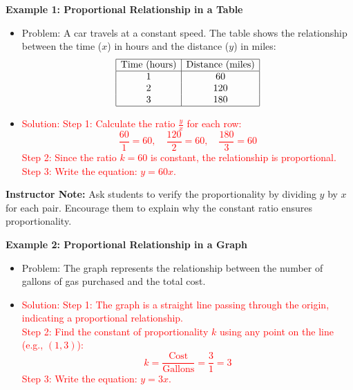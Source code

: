 \documentclass[12pt]{article}
\begin{document}
\vspace{1em}

\begin{tcolorbox}[colframe=black!60, colback=white, 
coltitle=black, colbacktitle=black!15, fonttitle=\bfseries\Large, 
title=Examples, halign title=center, left=10pt, right=10pt, top=10pt, bottom=10pt]
\textbf{Example 1: Proportional Relationship in a Table}
\begin{itemize}
    \item Problem: A car travels at a constant speed. The table shows the relationship between the time (\(x\)) in hours and the distance (\(y\)) in miles:
    \[
    \begin{array}{|c|c|}
    \hline
    \text{Time (hours)} & \text{Distance (miles)} \\
    \hline
    1 & 60 \\
    2 & 120 \\
    3 & 180 \\
    \hline
    \end{array}
    \]
    \item \textcolor{red}{Solution: Step 1: Calculate the ratio \( \frac{y}{x} \) for each row: \\ 
    \[
    \frac{60}{1} = 60, \quad \frac{120}{2} = 60, \quad \frac{180}{3} = 60
    \] 
    Step 2: Since the ratio \(k = 60\) is constant, the relationship is proportional. \\ 
    Step 3: Write the equation: \(y = 60x\).}
\end{itemize}

{\color{blue} \textbf{Instructor Note:} Ask students to verify the proportionality by dividing \(y\) by \(x\) for each pair. Encourage them to explain why the constant ratio ensures proportionality.}

\textbf{Example 2: Proportional Relationship in a Graph}
\begin{itemize}
    \item Problem: The graph represents the relationship between the number of gallons of gas purchased and the total cost.

    \item \textcolor{red}{Solution: Step 1: The graph is a straight line passing through the origin, indicating a proportional relationship. \\ 
    Step 2: Find the constant of proportionality \(k\) using any point on the line (e.g., \((1, 3)\)): \\
    \[
    k = \frac{\text{Cost}}{\text{Gallons}} = \frac{3}{1} = 3
    \]
    Step 3: Write the equation: \(y = 3x\).}
\end{itemize}


\end{tcolorbox}
\end{document}
